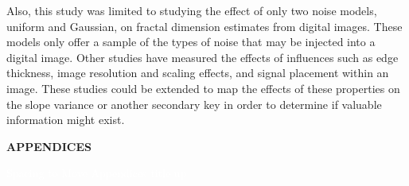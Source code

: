 \documentclass[12pt, oneside]{book}
\begin{document}
Also, this study was limited to studying the effect of only two noise models, uniform and Gaussian, on fractal dimension estimates from digital images.  These models only offer a sample of the types of noise that may be injected into a digital image.  Other studies have measured the effects of influences such as edge thickness, image resolution and scaling effects, and signal placement within an image.  These studies could be extended to map the effects of these properties on the slope variance or another secondary key in order to determine if valuable information might exist.




%
%

\newpage

\clearpage
\markboth{}{}



\clearpage
%
%

\begin{center}
\vspace*{\fill}
\textbf{APPENDICES}
\vspace{60mm}  %

\textcolor{white}{ Spacing to Move Appendices title up}
\vspace*{\fill}
\end{center}
\end{document}
